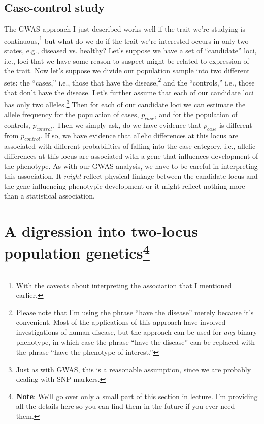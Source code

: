\documentclass[12pt]{article}
\begin{document}
\subsection*{Case-control study}

The GWAS approach I just described works well if the trait we're
studying is continuous,\footnote{With the caveats about interpreting
  the association that I mentioned earlier.} but what do we do if the
trait we're interested occurs in only two states, e.g., diseased
vs. healthy? Let's suppose we have a set of ``candidate'' loci, i.e.,
loci that we have some reason to suspect might be related to
expression of the trait. Now let's suppose we divide our population
sample into two different sets: the ``cases,'' i.e., those that have
the disease,\footnote{Please note that I'm using the phrase ``have the
  disease'' merely because it's convenient. Most of the applications
  of this approach have involved investigations of human disease, but
  the approach can be used for {\it any\/} binary phenotype, in which
  case the phrase ``have the disease'' can be replaced with the phrase
  ``have the phenotype of interest.''} and the ``controls,'' i.e.,
those that don't have the disease. Let's further assume that each of
our candidate loci has only two alleles.\footnote{Just as with GWAS,
  this is a reasonable assumption, since we are probably dealing with
  SNP markers.} Then for each of our candidate loci we can estimate
the allele frequency for the population of cases, $p_{case}$, and for
the population of controls, $p_{control}$. Then we simply ask, do we
have evidence that $p_{case}$ is different from $p_{control}$. If so,
we have evidence that allelic differences at this locus are associated
with different probabilities of falling into the case category, i.e.,
allelic differences at this locus are associated with a gene that
influences development of the phenotype. As with our GWAS analysis, we
have to be careful in interpreting this association. It {\it might\/}
reflect physical linkage between the candidate locus and the gene
influencing phenotypic development or it might reflect nothing more
than a statistical association.

\section*{A digression into two-locus population
  genetics\footnote{{\bf Note}: We'll go over only a small part of
  this section in lecture. I'm providing all the details here so you
  can find them in the future if you ever need them.}}
\end{document}
